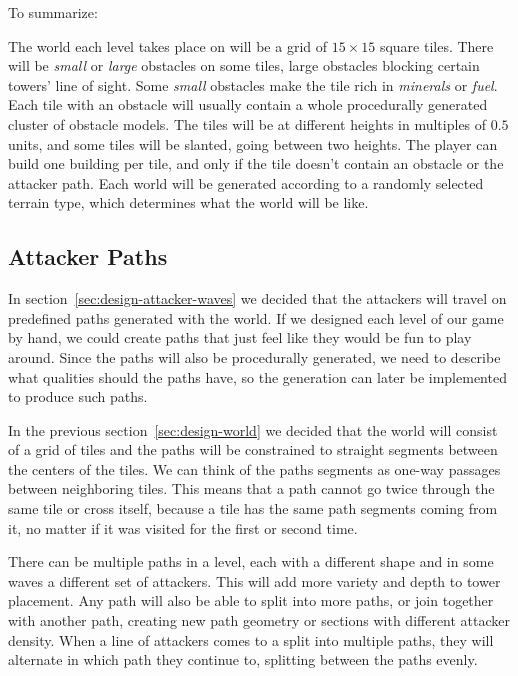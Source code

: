 To summarize:
\reqreset
\begin{itemize}
     The world each level takes place on will be a grid of $15 \times 15$ square tiles.
     There will be \emph{small} or \emph{large} obstacles on some tiles, large obstacles blocking certain towers' line of sight. Some \emph{small} obstacles make the tile rich in \emph{minerals} or \emph{fuel}.
     Each tile with an obstacle will usually contain a whole procedurally generated cluster of obstacle models.
     The tiles will be at different heights in multiples of $0.5$ units, and some tiles will be slanted, going between two heights.
     The player can build one building per tile, and only if the tile doesn't contain an obstacle or the attacker path.
     Each world will be generated according to a randomly selected terrain type, which determines what the world will be like.
\end{itemize}

\subsection{Attacker Paths}\label{sec:design-paths}

In section~\ref{sec:design-attacker-waves} we decided that the attackers will travel on predefined paths generated with the world.
If we designed each level of our game by hand, we could create paths that just feel like they would be fun to play around.
Since the paths will also be procedurally generated, we need to describe what qualities should the paths have, so the generation can later be implemented to produce such paths.

In the previous section~\ref{sec:design-world} we decided that the world will consist of a grid of tiles and the paths will be constrained to straight segments between the centers of the tiles.
We can think of the paths segments as one-way passages between neighboring tiles.
This means that a path cannot go twice through the same tile or cross itself, because a tile has the same path segments coming from it, no matter if it was visited for the first or second time.

There can be multiple paths in a level, each with a different shape and in some waves a different set of attackers.
This will add more variety and depth to tower placement.
Any path will also be able to split into more paths, or join together with another path, creating new path geometry or sections with different attacker density.
When a line of attackers comes to a split into multiple paths, they will alternate in which path they continue to, splitting between the paths evenly.

